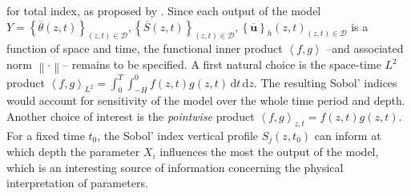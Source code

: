 \documentclass[draft]{agujournal2019}
\newcommand{\an}[1]{\ensuremath{\left\langle#1\right\rangle}} %
\newcommand{\pbra}[1]{\ensuremath{\left\{#1\right\}}} %
\newcommand{\norm}[1]{\left\lVert #1 \right\rVert} %
\newcommand{\dd}{\mathrm{d}}
\begin{document}
%
for total index, as proposed by . Since each output of the model $Y =  \pbra{\overline{\theta}(z,t)}_{(z,t)\in \mathcal{D}} , \pbra{\overline{S}(z,t)}_{(z,t)\in \mathcal{D}} , \pbra{\overline{\bm u}}_h(z,t)_{(z,t)\in \mathcal{D}}$ is a function of space and time, the functional inner product $\an{f, g}$ --and associated norm $\norm{ \cdot }$-- remains to be specified. A first natural choice is the space-time $L^2$ product $\an{f,g}_{L^2} = \int_0^T \int_{-H}^0 f(z,t) g(z,t) \, \dd t \, \dd z$. The resulting Sobol' indices would account for sensitivity of the model over the whole time period and depth. 
%
Another choice of interest is the \textit{pointwise} product  $\an{f,g}_{z,t} =  f(z,t) g(z,t) $. For a fixed time $t_0$, the Sobol' index vertical profile $S_j(z,t_0)$ can inform at which depth the parameter $X_i$ influences the most the output of the model, which is an interesting source of information concerning the physical interpretation of parameters.
%
%
%
\end{document}
